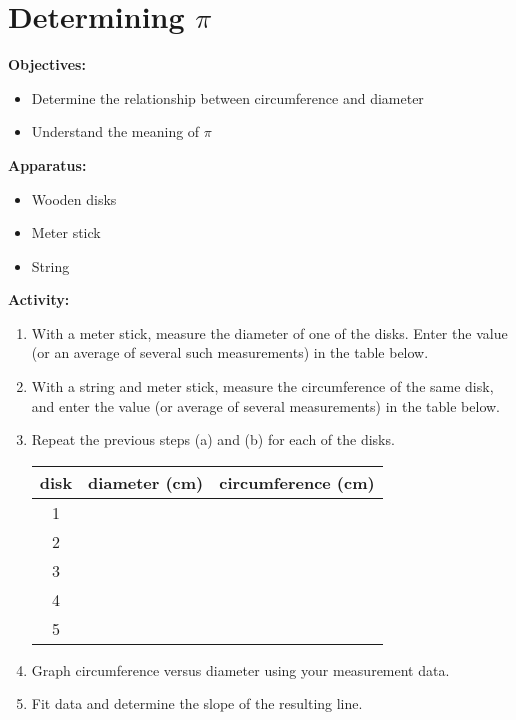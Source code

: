 \section{Determining \texorpdfstring{$\pi$}{Pi} }

\makelabheader %

\textbf{Objectives:}

\begin{itemize}[nosep]
\item Determine the relationship between circumference and diameter 
\item Understand the meaning of $\pi$
\end{itemize}

\textbf{Apparatus:}

\begin{itemize}[nosep]
\item Wooden disks
\item Meter stick
\item String
\end{itemize}
\textbf{Activity:}

\begin{enumerate}[labparts]

\item With a meter stick, measure the diameter of one of the disks. Enter the value (or an average of several such measurements) in the table below.

\item With a string and meter stick, measure the circumference of the same disk, and enter the value (or average of several measurements) in the table below.

\item Repeat the previous steps (a) and (b) for each of the disks.

\begin{center} \begin{tabular}{|c|c|c|} \hline disk & diameter (cm) & circumference (cm) \\ \hline\hline 1 & & \\ \hline 2 & & \\ \hline 3 & & \\ \hline 4 & & \\ \hline 5 & & \\ \hline \end{tabular} \end{center}

\item Graph circumference versus diameter using your measurement data.

\item Fit data and determine the slope of the resulting line. \end{enumerate}


